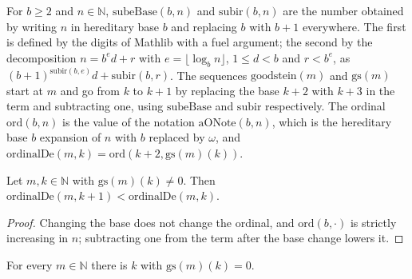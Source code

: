\begin{definition}
  \label{def:infinite-goodstein}
  \leanok
  \own{}
  For $b \ge 2$ and $n \in \mathbb{N}$, $\mathrm{subeBase}(b, n)$ and $\mathrm{subir}(b, n)$ are the number obtained by
  writing $n$ in hereditary base $b$ and replacing $b$ with $b+1$ everywhere. The first is defined by the digits of
  Mathlib with a fuel argument; the second by the decomposition $n = b^e d + r$ with $e = \lfloor \log_b n \rfloor$,
  $1 \le d < b$ and $r < b^e$, as $(b+1)^{\mathrm{subir}(b,e)} d + \mathrm{subir}(b, r)$. The sequences
  $\mathrm{goodstein}(m)$ and $\mathrm{gs}(m)$ start at $m$ and go from $k$ to $k+1$ by replacing the base $k+2$ with
  $k+3$ in the term and subtracting one, using $\mathrm{subeBase}$ and $\mathrm{subir}$ respectively. The ordinal
  $\mathrm{ord}(b, n)$ is the value of the notation $\mathrm{aONote}(b, n)$, which is the hereditary base $b$
  expansion of $n$ with $b$ replaced by $\omega$, and $\mathrm{ordinalDe}(m, k) = \mathrm{ord}(k+2, \mathrm{gs}(m)(k))$.
\end{definition}

\begin{theorem}
  \label{thm:infinite-ordinal-baja}
  \leanok
  Let $m, k \in \mathbb{N}$ with $\mathrm{gs}(m)(k) \ne 0$. Then $\mathrm{ordinalDe}(m, k+1) < \mathrm{ordinalDe}(m, k)$.
\end{theorem}

\begin{proof}
  \leanok
  Changing the base does not change the ordinal, and $\mathrm{ord}(b, \cdot)$ is strictly increasing in $n$; subtracting
  one from the term after the base change lowers it.
\end{proof}

\begin{theorem}
  \label{thm:infinite-goodstein-termina}
  \leanok
  For every $m \in \mathbb{N}$ there is $k$ with $\mathrm{gs}(m)(k) = 0$.
\end{theorem}

